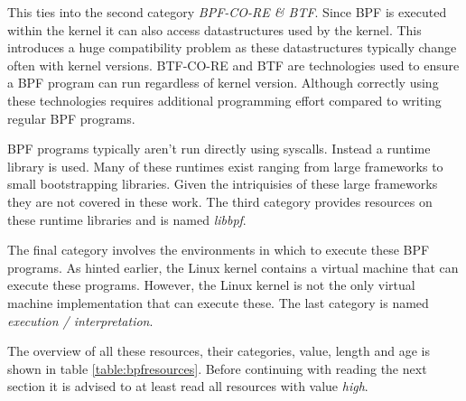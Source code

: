 \documentclass[conference]{IEEEtran}
\begin{document}
This ties into the second category \textit{BPF-CO-RE \& BTF}. Since BPF is
executed within the kernel it can also access datastructures used by the kernel.
This introduces a huge compatibility problem as these datastructures typically
change often with kernel versions. BTF-CO-RE and BTF are technologies used to
ensure a BPF program can run regardless of kernel version. Although correctly
using these technologies requires additional programming effort compared to
writing regular BPF programs.

BPF programs typically aren't run directly using syscalls. Instead a runtime
library is used. Many of these runtimes exist ranging from large frameworks to
small bootstrapping libraries. Given the intriquisies of these large frameworks
they  are not covered in these work. The third category provides resources on
these runtime libraries and is named \textit{libbpf}.

The final category involves the environments in which to execute these BPF
programs. As hinted earlier, the Linux kernel contains a virtual machine that
can execute these programs. However, the Linux kernel is not the only virtual
machine implementation that can execute these. The last category is named
\textit{execution / interpretation}.

The overview of all these resources, their categories, value, length and age
is shown in table \ref{table:bpfresources}. Before continuing with reading the
next section it is advised to at least read all resources with value
\textit{high}.
\end{document}
